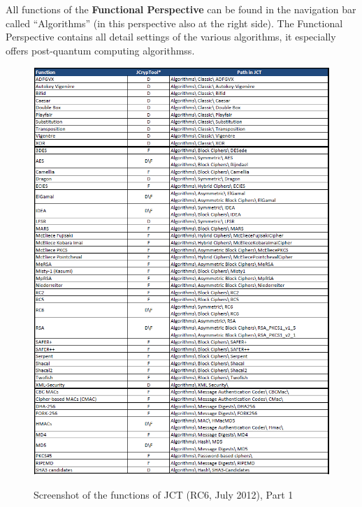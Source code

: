 All functions of the {\bf Functional Perspective} can be found in the navigation bar called ``Algorithms'' (in this perspective also at the right side).
The Functional Perspective contains all detail settings of the various algorithms, it especially offers post-quantum computing algorithmss.

\clearpage
\begin{figure}[hb]
\begin{center}
\vspace{-30pt}
\includegraphics[scale=0.8, angle=0] {figures/JCT-functions-en-1}
\hypertarget{template-overview-CT2}{}
\caption{Screenshot of the functions of JCT (RC6, July 2012), Part 1} 
\label{functions-overview-1-JCT}
\end{center}
\end{figure}
\clearpage

